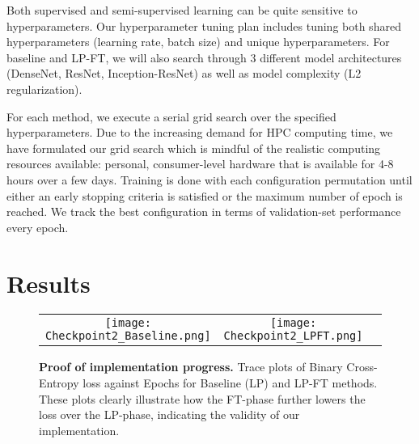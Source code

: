 \documentclass{article}
\begin{document}
Both supervised and semi-supervised learning can be quite sensitive to hyperparameters. Our hyperparameter tuning plan includes tuning both shared hyperparameters (learning rate, batch size) and unique hyperparameters. For baseline and LP-FT, we will also search through 3 different model architectures (DenseNet, ResNet, Inception-ResNet) as well as model complexity (L2 regularization).

For each method, we execute a serial grid search over the specified hyperparameters. Due to the increasing demand for HPC computing time, we have formulated our grid search which is mindful of the realistic computing resources available: personal, consumer-level hardware that is available for 4-8 hours over a few days. Training is done with each configuration permutation until either an early stopping criteria is satisfied or the maximum number of epoch is reached. We track the best configuration in terms of validation-set performance every epoch.


\section{Results}

\begin{figure}[!h]
    \begin{tabular}{c c c}    
    \texttt{[image: Checkpoint2\_Baseline.png]}
    &
    \texttt{[image: Checkpoint2\_LPFT.png]}
    \end{tabular}
    \caption{\textbf{Proof of implementation progress.} Trace plots of Binary Cross-Entropy loss against Epochs for Baseline (LP) and LP-FT methods. These plots clearly illustrate how the FT-phase further lowers the loss over the LP-phase, indicating the validity of our implementation.}
\end{figure}
\end{document}
